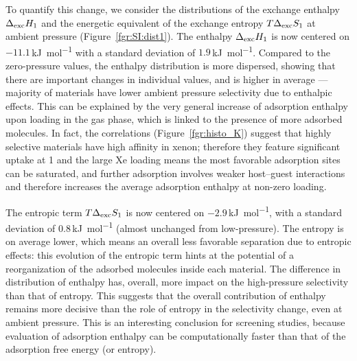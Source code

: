 \documentclass[main.tex]{subfiles}
\begin{document}
To quantify this change, we consider the distributions of the exchange enthalpy $\Delta_{\text{exc}}H_{\text{1}}$ and the energetic equivalent of the exchange entropy $T\Delta_{\text{exc}}S_{\text{1}}$ at ambient pressure (Figure~\ref{fgr:SI:dist1}). The enthalpy $\Delta_{\text{exc}}H_{\text{1}}$ is now centered on $-11.1$\,\si{\kilo\joule\per\mol} with a standard deviation of $1.9$\,\si{\kilo\joule\per\mol}. Compared to the zero-pressure values, the enthalpy distribution is more dispersed, showing that there are important changes in individual values, and is higher in average --- majority of materials have lower ambient pressure selectivity due to enthalpic effects. This can be explained by the very general increase of adsorption enthalpy upon loading in the gas phase, which is linked to the presence of more adsorbed molecules. In fact, the correlations (Figure~\ref{fgr:histo_K}) suggest that highly selective materials have high affinity in xenon; therefore they feature significant uptake at \SI{1}{\atm} and the large Xe loading means the most favorable adsorption sites can be saturated, and further adsorption involves weaker host--guest interactions and therefore increases the average adsorption enthalpy at non-zero loading.

The entropic term $T\Delta_{\text{exc}}S_{\text{1}}$ is now centered on $-2.9$\,\si{\kilo\joule\per\mol}, with a standard deviation of $0.8$\,\si{\kilo\joule\per\mol} (almost unchanged from low-pressure). The entropy is on average lower, which means an overall less favorable separation due to entropic effects: this evolution of the entropic term hints at the potential of a reorganization of the adsorbed molecules inside each material. The difference in distribution of enthalpy has, overall, more impact on the high-pressure selectivity than that of entropy. This suggests that the overall contribution of enthalpy remains more decisive than the role of entropy in the selectivity change, even at ambient pressure. This is an interesting conclusion for screening studies, because evaluation of adsorption enthalpy can be computationally faster than that of the adsorption free energy (or entropy).
\end{document}
